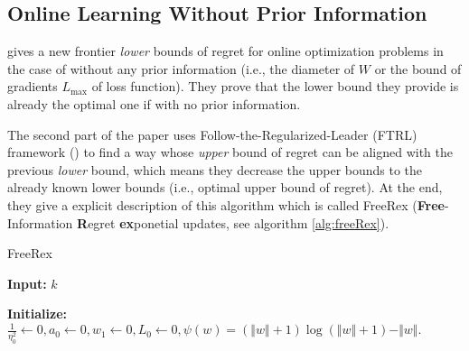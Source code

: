 \subsection{Online Learning Without Prior Information}
\label{ssec: online_learning_without_prior_info}
\cite{Cutkosky2017} gives a new frontier \textit{lower} bounds of regret for online optimization problems in the case of without any prior information (i.e., the diameter of $W$ or the bound of gradients $L_{\max}$ of loss function). They prove that the lower bound they provide is already the optimal one if with no prior information. 

The second part of the paper uses Follow-the-Regularized-Leader (FTRL) framework (\cite{shalev2012online}) to find a way whose \textit{upper} bound of regret can be aligned with the previous \textit{lower} bound, which means they decrease the upper bounds to the already known lower bounds (i.e., optimal upper bound of regret). At the end, they give a explicit description of this algorithm  which is called FreeRex (\textbf{Free}-Information \textbf{R}egret \textbf{ex}ponetial updates, see algorithm \ref{alg:freeRex}).
\begin{algorithm}
\caption{FreeRex}
\label{alg:freeRex}
{\bfseries Input:} $k$

{\bfseries Initialize:} $\frac{1}{\eta_0^2} \leftarrow 0, a_0 \leftarrow 0, w_1 \leftarrow 0, L_0 \leftarrow 0, \psi(w) = (\Vert w \Vert + 1)\log(\Vert w \Vert + 1) - \Vert w \Vert.$
\begin{algorithmic}[1]
\EndFor
\end{algorithmic}
\end{algorithm}

